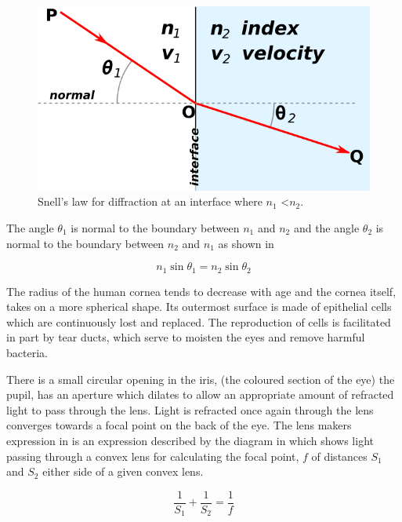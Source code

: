\begin{figure}[htbp]
  \centering
    \includegraphics{figures/snells}
  \caption{Snell's law for diffraction at an interface where $n_1$ \textless $n_2$.\cite{wikisnell}}
  \label{fig:snell}
\end{figure}

The angle $\theta_1$ is normal to the boundary between $n_1$ and $n_2$
and the angle $\theta_2$ is normal to the boundary between $n_2$ and $n_1$
as shown in 

\begin{equation}
n_1\sin\theta_1=n_2\sin\theta_2
\label{eq:refractive}
\end{equation}

The radius of the human cornea tends to decrease with age and the cornea
itself, takes on a more spherical shape.\cite{guirao2000optical} Its
outermost surface is made of epithelial cells which are continuously lost
and replaced.\cite{jester1999cellular,hassell2010molecular} The reproduction
of cells is facilitated in part by tear ducts, which  serve to moisten the
eyes and remove harmful bacteria.\cite{holly1977tear}

There is a small circular opening in the iris, (the coloured section of
the eye) the pupil, has an aperture which dilates to allow an appropriate
amount of refracted light to pass through the lens. Light is refracted
once again through the lens converges towards a focal point on the back
of the eye. The lens makers expression in  is an
expression described by the diagram in  which
shows light passing through a convex lens for calculating the focal point,
$f$ of distances $S_1$ and $S_2$ either side of a given convex lens.
\cite{greivenkamp2004field}

\begin{equation}
\frac{1}{S_1} + \frac{1}{S_2} = \frac{1}{f}
\label{eq:lens_makers}
\end{equation}

